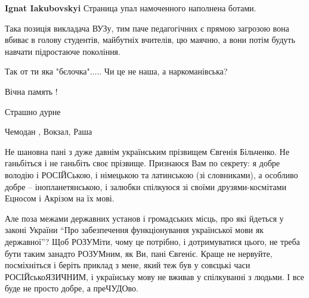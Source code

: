 \begin{itemize}
\begin{itemize}
\textbf{Ignat Iakubovskyi} Страница упал намоченного наполнена ботами.
\end{itemize}

 
Така позиція викладача ВУЗу, тим паче педагогічних є прямою загрозою вона вбиває в голову студентів, майбутніх вчителів, цю маячню, а вони потім будуть навчати підростаюче покоління.

 
Так от ти яка "бєлочка"..... Чи це не наша, а наркоманівська?

 
Вічна память !

 
Страшно дурне

 
Чемодан , Вокзал, Раша

 

Не шановна пані з дуже давнім українським прізвищем Євгенія Більченко. Не
ганьбіться і не ганьбіть своє прізвище. Признаюся Вам по секрету: я добре
володію і РОСІЙСькою, і німецькою та латинською (зі словниками), а особливо
добре – інопланетянською, і залюбки спілкуюся зі своїми друзями-космітами
Ецносом і Акрізом на їх мові. 

Але поза межами державних установ і громадських місць, про які йдеться у законі
України \enquote{Про забезпечення функціонування української мови як державної}? Щоб
РОЗУМіти, чому це потрібно, і дотримуватися цього, не треба бути таким занадто
РОЗУМним, як Ви, пані Євгеніє. Краще не нервуйте, посміхніться і беріть приклад
з мене, який теж був у совєцькі часи РОСІЙськоЯЗИЧНИМ, і українську мову не
вживав у спілкуванні з людьми. І все буде не просто добре, а преЧУДОво. 


\end{itemize}
